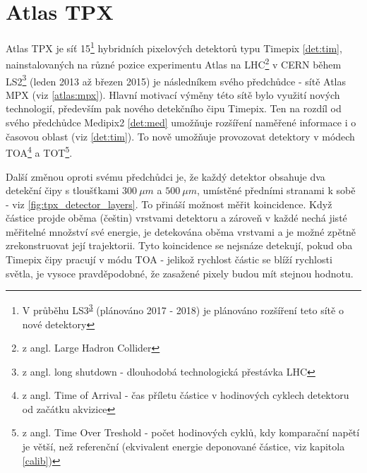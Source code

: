 

\chapter{Atlas TPX}\label{atlas}
Atlas TPX je síť 15\footnote{V průběhu LS3\textsuperscript{\ref{ls}} (plánováno 2017 - 2018) je plánováno rozšíření teto sítě o nové detektory} hybridních pixelových detektorů typu Timepix \ref{det:tim}, nainstalovaných na různé pozice experimentu Atlas na LHC\footnote{z angl. Large Hadron Collider} v CERN během LS2\footnote{\label{ls}z angl. long shutdown - dlouhodobá technologická přestávka LHC} (leden 2013 až březen 2015) je následníkem svého předchůdce - sítě Atlas MPX (viz \ref{atlas:mpx}). Hlavní motivací výměny této sítě bylo využití nových technologií, především pak nového detekčního čipu Timepix. Ten na rozdíl od svého předchůdce Medipix2 \ref{det:med} umožňuje rozšíření naměřené informace i o časovou oblast (viz \ref{det:tim}). To nově umožňuje provozovat detektory v módech TOA\footnote{z angl. Time of Arrival - čas příletu částice v hodinových cyklech detektoru od začátku akvizice} a TOT\footnote{z angl. Time Over Treshold - počet hodinových cyklů, kdy komparační napětí je větší, než referenční (ekvivalent energie deponované částice, viz kapitola \ref{calib})}. 

Další změnou oproti svému předchůdci je, že každý detektor obsahuje dva detekční čipy s tloušťkami $300~\mu m$ a $500~\mu m$, umístěné předními stranami k sobě - viz \ref{fig:tpx_detector_layers}. To přináší možnost měřit koincidence. Když částice projde oběma (\todo češtin) vrstvami  detektoru a zároveň v každé nechá jisté měřitelné množství své energie, je detekována oběma vrstvami a je možné zpětně zrekonstruovat její trajektorii. Tyto koincidence se nejsnáze detekují, pokud oba Timepix čipy pracují v módu TOA - jelikož rychlost částic se blíží rychlosti světla, je vysoce pravděpodobné, že zasažené pixely budou mít stejnou hodnotu.


